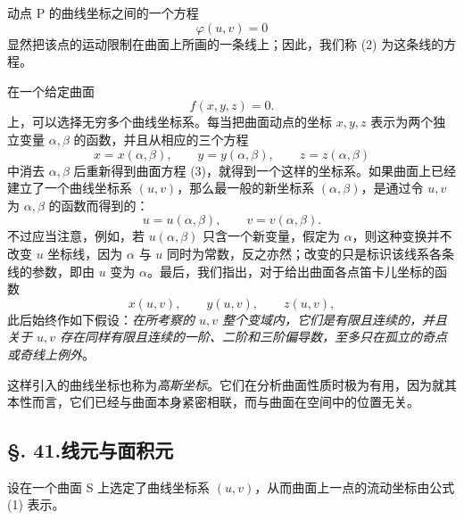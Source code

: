 动点 P 的曲线坐标之间的一个方程
\begin{equation}\tag{2}
 \varphi(u,v)=0
\end{equation}
显然把该点的运动限制在曲面上所画的一条线上；因此，我们称 (2) 为这条线的方程。

在一个给定曲面
\begin{equation}\tag{3}
 f(x,y,z)=0.
\end{equation}
上，可以选择无穷多个曲线坐标系。每当把曲面动点的坐标 \(x,y,z\) 表示为两个独立变量 \(\alpha,\beta\) 的函数，并且从相应的三个方程
\[
 x=x(\alpha,\beta),\qquad y=y(\alpha,\beta),\qquad z=z(\alpha,\beta)
\]
中消去 \(\alpha,\beta\) 后重新得到曲面方程 (3)，就得到一个这样的坐标系。如果曲面上已经建立了一个曲线坐标系 \((u,v)\)，那么最一般的新坐标系 \((\alpha,\beta)\)，是通过令 \(u,v\) 为 \(\alpha,\beta\) 的函数而得到的：
\[
 u=u(\alpha,\beta),\qquad v=v(\alpha,\beta).
\]
不过应当注意，例如，若 \(u(\alpha,\beta)\) 只含一个新变量，假定为 \(\alpha\)，则这种变换并不改变 \(u\) 坐标线，因为 \(\alpha\) 与 \(u\) 同时为常数，反之亦然；改变的只是标识该线系各条线的参数，即由 \(u\) 变为 \(\alpha\)。最后，我们指出，对于给出曲面各点笛卡儿坐标的函数
\[
 x(u,v),\qquad y(u,v),\qquad z(u,v),
\]
此后始终作如下假设：\emph{在所考察的 \(u,v\) 整个变域内，它们是有限且连续的，并且关于 \(u,v\) 存在同样有限且连续的一阶、二阶和三阶偏导数，至多只在孤立的奇点或奇线上例外}。

这样引入的曲线坐标也称为\emph{高斯坐标}。它们在分析曲面性质时极为有用，因为就其本性而言，它们已经与曲面本身紧密相联，而与曲面在空间中的位置无关。

\subsection*{\S. 41.\quad 线元与面积元}

设在一个曲面 S 上选定了曲线坐标系 \((u,v)\)，从而曲面上一点的流动坐标由公式 (1) 表示。

